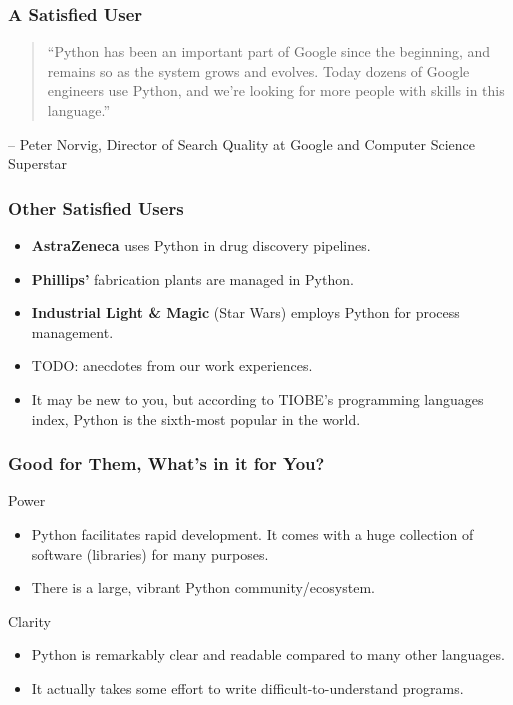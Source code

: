 \documentclass[10pt]{beamer}
\begin{document}
\begin{frame}
  \frametitle{A Satisfied User}
  \small
  \begin{quote}
      ``Python has been an important part of Google since the beginning, and remains so as the system grows and evolves. Today dozens of Google engineers use Python, and we're looking for more people with skills in this language.''
  \end{quote}
  \begin{flushright}
    -- Peter Norvig, Director of Search Quality at Google and Computer Science Superstar
  \end{flushright}
\end{frame}

\begin{frame}
  \frametitle{Other Satisfied Users}
  \begin{itemize}
    \item \textbf{AstraZeneca} uses Python in drug discovery pipelines.
    \item \textbf{Phillips'} fabrication plants are managed in Python.
    \item \textbf{Industrial Light \& Magic} (Star Wars) employs Python for process management.
    \item TODO: anecdotes from our work experiences.
    \item It may be new to you, but according to TIOBE's programming languages index, Python is the sixth-most popular in the world.
  \end{itemize}
\end{frame}

\begin{frame}
  \frametitle{Good for Them, What's in it for You?}
  \begin{block}{Power}
    \begin{itemize}
      \item Python facilitates rapid development.
        It comes with a huge collection of software (libraries) for many purposes.
      \item There is a large, vibrant Python community/ecosystem.
    \end{itemize}
  \end{block}
  \begin{block}{Clarity}
    \begin{itemize}
      \item Python is remarkably clear and readable compared to many other languages.
      \item It actually takes some effort to write difficult-to-understand programs.
    \end{itemize}
  \end{block}
\end{frame}
\end{document}
